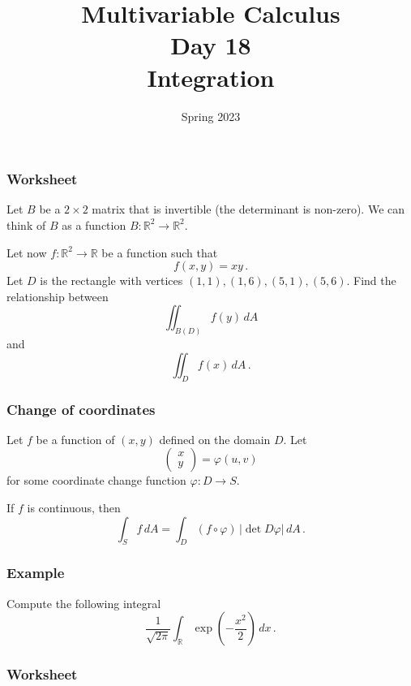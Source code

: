 \documentclass[aspectratio=169]{beamer}
\title{ Multivariable Calculus \\ Day  18\\ Integration }
\date{Spring 2023}
\newcommand{\R}{\mathbb{R}}
\begin{document}
\maketitle

\begin{frame}
    \frametitle{Worksheet}
         Let $B$ be a $2\times 2$ matrix that is invertible (the determinant is non-zero).
        We can think of $B$ as a function $B: \R^2 \to \R^2$.

        Let now $f:\R^2 \to \R$ be a function such that
        \begin{equation*}
            f(x,y) = xy \,.
        \end{equation*}
        Let $D$ is the rectangle with vertices $(1,1), (1,6), (5,1), (5,6)$.
    Find the relationship between
    \begin{equation*}
        \iint_{B(D)} f(y) \, dA 
    \end{equation*}
    and
    \begin{equation*}
        \iint_D f(x) \, dA \,.
    \end{equation*}
\end{frame}


\begin{frame}
    \frametitle{Change of coordinates}
    Let $f$ be a function of  $(x,y)$ defined on the domain $D$. 
    Let 
    \begin{equation*}
        \begin{pmatrix}
            x \\ y
        \end{pmatrix}
         = \varphi(u,v)
    \end{equation*}
    for some coordinate change function $\varphi: D \to S$.
    \begin{theorem}
        If $f$ is continuous, then
        \begin{equation*}
            \int_S f \, dA = \int_D (f\circ \varphi) \,|\det D \varphi| \, dA \,.
        \end{equation*}
    \end{theorem}
\end{frame}


\begin{frame}
    \frametitle{Example}
    Compute the following integral
    \begin{equation*}
        \frac{1}{\sqrt{2\pi}}\int_{\R} \exp\left(-\frac{x^2}{2}\right) \, dx \,.
    \end{equation*}
\end{frame}

\begin{frame}
    \frametitle{Worksheet}
\end{frame}
\end{document}
